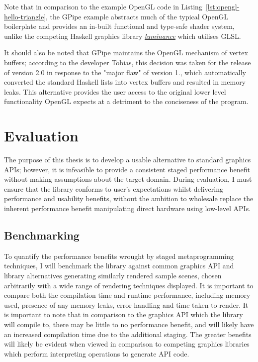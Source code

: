 \documentclass[12pt,twoside]{report}
\begin{document}
Note that in comparison to the example OpenGL code in Listing~\ref{lst:opengl-hello-triangle}, the GPipe example abstracts much of the typical OpenGL boilerplate and provides an in-built functional and type-safe shader system, unlike the competing Haskell graphics library \href{https://hackage.haskell.org/package/luminance}{\textit{luminance}} which utilises GLSL. 

It should also be noted that GPipe maintains the OpenGL mechanism of vertex buffers; according to the developer Tobias, this decision was taken for the release of version 2.0 in response to the "major flaw" of version 1., which automatically converted the standard Haskell lists into vertex buffers and resulted in memory leaks. This alternative provides the user access to the original lower level functionality OpenGL expects at a detriment to the conciseness of the program. \autocite{tobias_bexelius_gpipe_2015}


\chapter{Evaluation}

The purpose of this thesis is to develop a usable alternative to standard graphics APIs; however, it is infeasible to provide a consistent staged performance benefit without making assumptions about the target domain. During evaluation, I must ensure that the library conforms to user's expectations whilst delivering performance and usability benefits, without the ambition to wholesale replace the inherent performance benefit manipulating direct hardware using low-level APIs. 

\section{Benchmarking}

To quantify the performance benefits wrought by staged metaprogramming techniques, I will benchmark the library against common graphics API and library alternatives generating similarly rendered sample scenes, chosen arbitrarily with a wide range of rendering techniques displayed. It is important to compare both the compilation time and runtime performance, including memory used, presence of any memory leaks, error handling and time taken to render. It is important to note that in comparison to the graphics API which the library will compile to, there may be little to no performance benefit, and will likely have an increased compilation time due to the additional staging. The greater benefits will likely be evident when viewed in comparison to competing graphics libraries which perform interpreting operations to generate API code.
\end{document}
